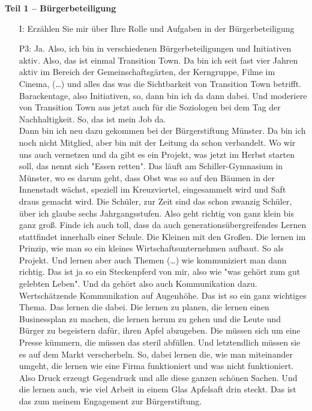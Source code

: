 \textbf{Teil 1 -- B{\"u}rgerbeteiligung}
\begin{itemize}
    \item[I:] Erz{\"a}hlen Sie mir {\"u}ber Ihre Rolle und Aufgaben in der B{\"u}rgerbeteiligung
    \item[P3:] Ja. Also, ich bin in verschiedenen B{\"u}rgerbeteiligungen und Initiativen aktiv. Also, das ist einmal Transition Town. Da bin ich seit fast vier Jahren aktiv im Bereich der Gemeinschaftsg{\"a}rten, der Kerngruppe, Filme im Cinema, (\dots) und alles das was die Sichtbarkeit von Transition Town betrifft. Barackentage, also Initiativen, so, dann bin ich da dann dabei. Und moderiere von Transition Town aus jetzt auch f{\"u}r die Soziologen bei dem Tag der Nachhaltigkeit. So, das ist mein Job da.\\
    Dann bin ich neu dazu gekommen bei der B{\"u}rgerstiftung M{\"u}nster. Da bin ich noch nicht Mitglied, aber bin mit der Leitung da schon verbandelt. Wo wir uns auch vernetzen und da gibt es ein Projekt, was jetzt im Herbst starten soll, das nennt sich "Essen retten". Das l{\"a}uft am Schiller-Gymnasium in M{\"u}nster, wo es darum geht, dass Obst was so auf den B{\"a}umen in der Innenstadt w{\"a}chst, speziell im Kreuzviertel, eingesammelt wird und Saft draus gemacht wird. Die Sch{\"u}ler, zur Zeit sind das schon zwanzig Sch{\"u}ler, {\"u}ber ich glaube sechs Jahrgangsstufen. Also geht richtig von ganz klein bis ganz gro{\ss}. Finde ich auch toll, dass da auch generations{\"u}bergreifendes Lernen stattfindet innerhalb einer Schule. Die Kleinen mit den Gro{\ss}en. Die lernen im Prinzip, wie man so ein kleines Wirtschaftsunternehmen aufbaut. So als Projekt. Und lernen aber auch Themen (\dots) wie kommuniziert man dann richtig. Das ist ja so ein Steckenpferd von mir, also wie "was geh{\"o}rt zum gut gelebten Leben". Und da geh{\"o}rt also auch Kommunikation dazu. Wertsch{\"a}tzende Kommunikation auf Augenh{\"o}he. Das ist so ein ganz wichtiges Thema. Das lernen die dabei. Die lernen zu planen, die lernen einen Businessplan zu machen, die lernen herum zu gehen und die Leute und B{\"u}rger zu begeistern daf{\"u}r, ihren Apfel abzugeben. Die m{\"u}ssen sich um eine Presse k{\"u}mmern, die m{\"u}ssen das steril abf{\"u}llen. Und letztendlich m{\"u}ssen sie es auf dem Markt verscherbeln. So, dabei lernen die, wie man miteinander umgeht, die lernen wie eine Firma funktioniert und was nicht funktioniert. Also Druck erzeugt Gegendruck und alle diese ganzen sch{\"o}nen Sachen. Und die lernen auch, wie viel Arbeit in einem Glas Apfelsaft drin steckt. Das ist das zum meinem Engagement zur B{\"u}rgerstiftung.\\

\end{itemize}
